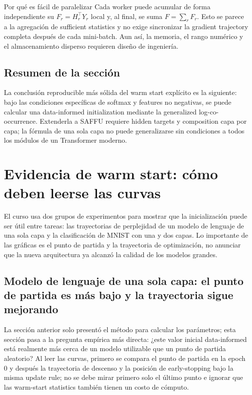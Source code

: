 \documentclass[a4paper]{article}
\begin{document}
\begin{knowledgebox}{Por qué es fácil de paralelizar}
Cada worker puede acumular de forma independiente su $F_r=H_r^\top Y_r$ local y, al final, se suma $F=\sum_rF_r$. Esto se parece a la agregación de sufficient statistics y no exige sincronizar la gradient trajectory completa después de cada mini-batch. Aun así, la memoria, el rango numérico y el almacenamiento disperso requieren diseño de ingeniería.
\end{knowledgebox}


\subsection{Resumen de la sección}

La conclusión reproducible más sólida del warm start explícito es la siguiente: bajo las condiciones específicas de softmax y features no negativas, se puede calcular una data-informed initialization mediante la generalized log-co-occurrence. Extenderla a SAFFU requiere hidden targets y composition capa por capa; la fórmula de una sola capa no puede generalizarse sin condiciones a todos los módulos de un Transformer moderno.
\section{Evidencia de warm start: cómo deben leerse las curvas}

El curso usa dos grupos de experimentos para mostrar que la inicialización puede ser útil entre tareas: las trayectorias de perplejidad de un modelo de lenguaje de una sola capa y la clasificación de MNIST con una y dos capas. Lo importante de las gráficas es el punto de partida y la trayectoria de optimización, no anunciar que la nueva arquitectura ya alcanzó la calidad de los modelos grandes.

\subsection{Modelo de lenguaje de una sola capa: el punto de partida es más bajo y la trayectoria sigue mejorando}

La sección anterior solo presentó el método para calcular los parámetros; esta sección pasa a la pregunta empírica más directa: ¿este valor inicial data-informed está realmente más cerca de un modelo utilizable que un punto de partida aleatorio? Al leer las curvas, primero se compara el punto de partida en la epoch 0 y después la trayectoria de descenso y la posición de early-stopping bajo la misma update rule; no se debe mirar primero solo el último punto e ignorar que las warm-start statistics también tienen un costo de cómputo.
\end{document}
